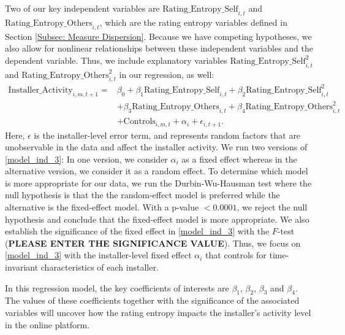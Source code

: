 \documentclass[msom,blindrev]{informs3}
\begin{document}
 Two of our key independent variables are $\text{Rating\_Entropy\_Self}_{i,t}$ and  $\text{Rating\_Entropy\_Others}_{i,t}$, which are the rating entropy variables defined in Section \ref{Subsec: Measure Dispersion}. Because we have competing hypotheses, we also allow for nonlinear relationships between these independent variables and the dependent variable. Thus, we include explanatory variables $\text{Rating\_Entropy\_Self}_{i,t}^{2}$ and $\text{Rating\_Entropy\_Others}_{i,t}^{2}$ in our regression, as well:
\begin{align}  \nonumber
    \text{Installer\_Activity}_{i,m,t+1}=&\beta_{0}+\beta_{1} \text{Rating\_Entropy\_Self}_{i,t}+\beta_{2} \text{Rating\_Entropy\_Self}_{i,t}^ {2}
    \\ \nonumber
    &+\beta_{3} \text{Rating\_Entropy\_Others}_{i,t}  +\beta_{4}\text{Rating\_Entropy\_Others}_{i,t}^{2} \\ \label{model_ind_3}
    &+ \text{Controls}_{i,m,t}+ \alpha_{i} + \epsilon_{i,t+1}.
\end{align}
 Here, $\epsilon$ is the installer-level error term, and represents random factors that are unobservable in the data and affect the installer activity.  We run two versions of \eqref{model_ind_3}: In one version, we consider $\alpha_{i}$ as a fixed effect whereas in the alternative version, we consider it as a random effect. To determine which model is more appropriate for our data, we run the Durbin-Wu-Hausman test where the null hypothesis is that the the random-effect model is preferred while the alternative is the fixed-effect model. With a p-value $<0.0001$, we reject the null hypothesis and conclude that the fixed-effect model is more appropriate. We also establish the significance of the fixed effect in \eqref{model_ind_3} with the $F$-test (\textbf{PLEASE ENTER THE SIGNIFICANCE VALUE}). Thus, we focus on \eqref{model_ind_3} with the installer-level fixed effect $\alpha_{i}$ that controls for time-invariant characteristics of each installer.

In this regression model, the key coefficients of interests are $\beta_{1}$, $\beta_{2}$, $\beta_{3}$ and $\beta_{4}$. The values of these coefficients together with the significance of the associated variables will uncover how the rating entropy impacts the installer's activity level in the online platform.
\end{document}
